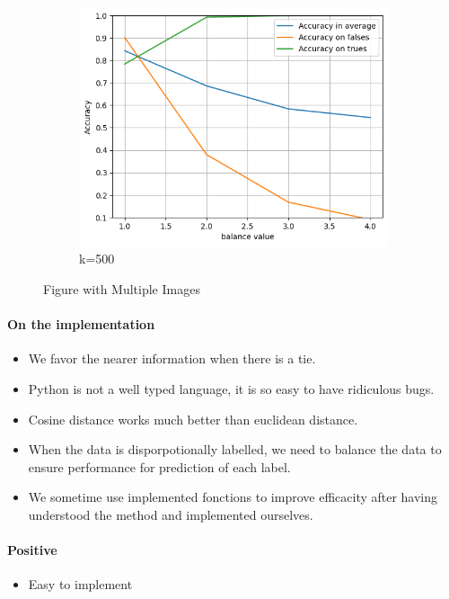 \documentclass{article}
\begin{document}
\begin{figure}[htbp]
\begin{subfigure}[t]{0.33\textwidth}
    \includegraphics[width=\linewidth]{balancek500.png}
    \caption{k=500}
  \end{subfigure}
  \caption{Figure with Multiple Images}
  \label{fig:balancenk}
\end{figure}

\paragraph{On the implementation} \begin{itemize}
  \item We favor the nearer information when there is a tie.
  \item Python is not a well typed language, it is so easy to have
  ridiculous bugs.
  \item Cosine distance works much better than euclidean distance.
  \item When the data is disporpotionally labelled, we need to balance the data to ensure performance for prediction of each label.
  \item We sometime use implemented fonctions to improve
  efficacity after having understood the method and
  implemented ourselves.
\end{itemize}

\paragraph{Positive} \begin{itemize}
  \item Easy to implement
\end{itemize}
\end{document}
